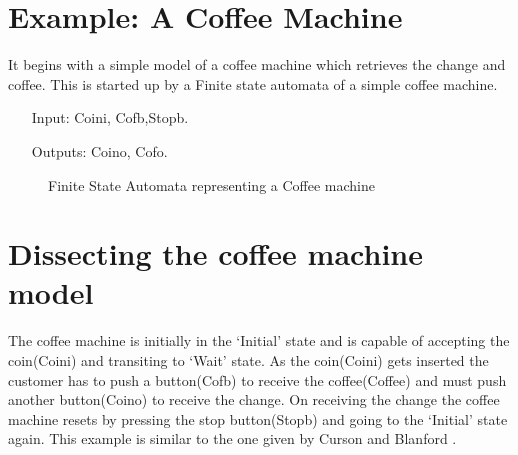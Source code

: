 \documentclass[a4paper,10pt]{report}
\begin{document}
\section{Example: A Coffee Machine} 
\label{Ex: Coffee machine}

It begins with a simple model of a coffee machine which retrieves the change and coffee. This is started up by a Finite state automata of a simple coffee machine.

\begin{itemize}
\item[Input:] Coini, Cofb,Stopb.
\item[Outputs:]Coino, Cofo.
\end{itemize}
\begin{figure}[h!]
\centering
{}
 \caption{Finite State Automata representing a Coffee machine}
\end{figure}
\section{Dissecting the coffee machine model}
\label{dissecting coffee machine}
 The coffee machine is initially in the `Initial' state and is capable of accepting the coin(Coini) and transiting to `Wait' state. As the coin(Coini) gets inserted the customer has to push a button(Cofb) to receive the coffee(Coffee) and must push another button(Coino) to receive the change. On receiving the change the coffee machine resets by pressing the stop button(Stopb) and going to the `Initial' state again. This example is similar to the one given by Curson and Blanford \cite{P.Curson}.
 
\end{document}
